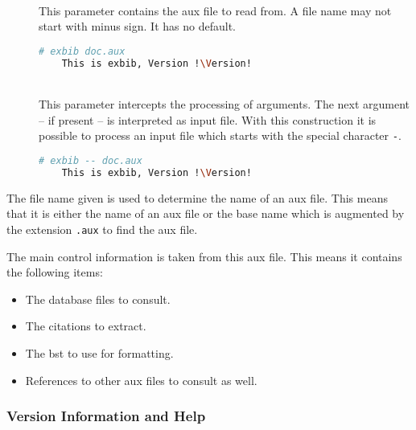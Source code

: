 \begin{description}
\item[]\ \\
  This parameter contains the aux file to read from. A file name may not
  start with minus sign. It has no default.
  \begin{lstlisting}[language=sh,escapechar=!]
    # exbib doc.aux
    This is exbib, Version !\Version!
  \end{lstlisting}
  
\item[\cli{-} ]
\item[\cli{-{}-} ]\ \\
  This parameter intercepts the processing of arguments. The next
  argument -- if present -- is interpreted as input file. With this
  construction it is possible to process an input file which starts
  with the special character \verb|-|.
  \begin{lstlisting}[language=sh,escapechar=!]
    # exbib -- doc.aux
    This is exbib, Version !\Version!
  \end{lstlisting}

\end{description}

The file name given is used to determine the name of an aux file. This
means that it is either the name of an aux file or the base name which
is augmented by the extension \texttt{.aux} to find the aux file.

The main control information is taken from this aux file. This means
it contains the following items:

\begin{itemize}
\item The database files to consult.
\item The citations to extract.
\item The bst to use for formatting.
\item References to other aux files to consult as well.
\end{itemize}

\subsubsection{Version Information and Help}

